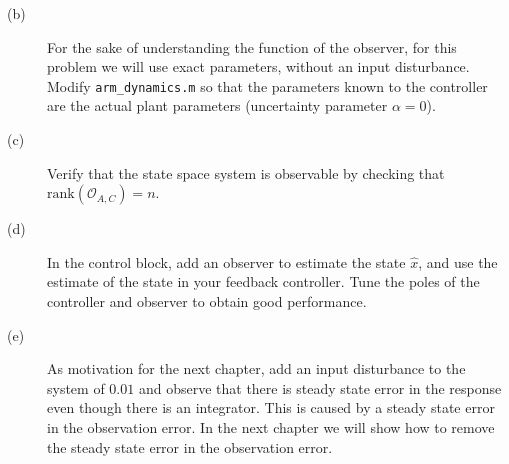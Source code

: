 \begin{description}
\item[(b)] For the sake of understanding the function of the observer, for this problem we will use exact parameters, without an input disturbance.  Modify {\tt  arm\_dynamics.m} so that the parameters known to the controller are the actual plant parameters (uncertainty parameter $\alpha=0$).
\item[(c)] Verify that the state space system is observable by checking that $\text{rank}(\mathcal{O}_{A,C})=n$.
\item[(d)] In the control block, add an observer to estimate the state $\hat{x}$, and use the estimate of the state in your feedback controller.
Tune the poles of the controller and observer to obtain good performance.  
\item[(e)] As motivation for the next chapter, add an input disturbance to the system of $0.01$ and observe that there is steady state error in the response even though there is an integrator.  This is caused by a steady state error in the observation error.  In the next chapter we will show how to remove the steady state error in the observation error.
\end{description}
